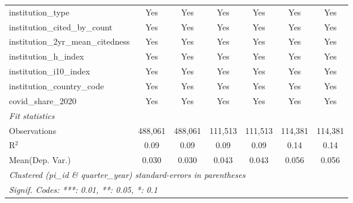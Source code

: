 \begin{tabular}{lcccccc}
   institution\_type                                           & Yes            & Yes            & Yes            & Yes            & Yes            & Yes\\  
   institution\_cited\_by\_count                               & Yes            & Yes            & Yes            & Yes            & Yes            & Yes\\  
   institution\_2yr\_mean\_citedness                           & Yes            & Yes            & Yes            & Yes            & Yes            & Yes\\  
   institution\_h\_index                                       & Yes            & Yes            & Yes            & Yes            & Yes            & Yes\\  
   institution\_i10\_index                                     & Yes            & Yes            & Yes            & Yes            & Yes            & Yes\\  
   institution\_country\_code                                  & Yes            & Yes            & Yes            & Yes            & Yes            & Yes\\  
   covid\_share\_2020                                          & Yes            & Yes            & Yes            & Yes            & Yes            & Yes\\  
   \midrule
   \emph{Fit statistics}\\
   Observations                                                & 488,061        & 488,061        & 111,513        & 111,513        & 114,381        & 114,381\\  
   R$^2$                                                       & 0.09           & 0.09           & 0.09           & 0.09           & 0.14           & 0.14\\  
Mean(Dep. Var.) & 0.030 & 0.030 & 0.043 & 0.043 & 0.056 & 0.056 \\
   \midrule \midrule
   \multicolumn{7}{l}{\emph{Clustered (pi\_id \& quarter\_year) standard-errors in parentheses}}\\
   \multicolumn{7}{l}{\emph{Signif. Codes: ***: 0.01, **: 0.05, *: 0.1}}\\
\end{tabular}
\par\endgroup
